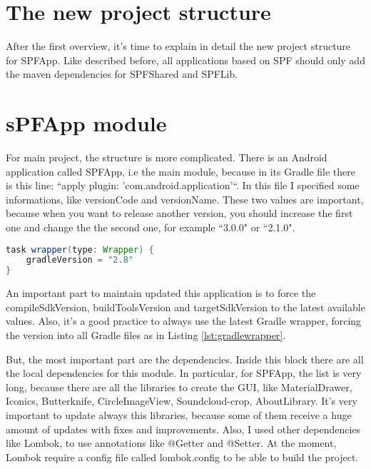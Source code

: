 \section{The new project structure}
After the first overview, it's time to explain in detail the new project structure for \textsf{SPFApp}. Like described before, all applications based on SPF should only add the maven dependencies for \textsf{SPFShared} and \textsf{SPFLib}.

\section*{sPFApp module}

For main project, the structure is more complicated.
There is an Android application called \textsf{SPFApp}, i.e the main module, because in its Gradle file there is this line: ``apply plugin: 'com.android.application'``.
In this file I specified some informations, like \textsf{versionCode} and \textsf{versionName}. These two values are important, because when you want to release another version, you should increase the first one and change the the second one, for example ``3.0.0" or ``2.1.0".

\begin{lstlisting}[caption={Gradle wapper},label=lst:gradlewrapper, language=Java]
task wrapper(type: Wrapper) {
    gradleVersion = "2.8"
}
\end{lstlisting}

An important part to maintain updated this application is to force the \textsf{compileSdkVersion}, \textsf{buildToolsVersion} and \textsf{targetSdkVersion} to the latest available values. Also, it's a good practice to always use the latest Gradle wrapper, forcing the version into all Gradle files as in Listing \ref{lst:gradlewrapper}.

But, the most important part are the dependencies.
Inside this block there are all the local dependencies for this module. In particular, for SPFApp, the list is very long, because there are all the libraries to create the GUI, like \textsf{MaterialDrawer}, \textsf{Iconics}, \textsf{Butterknife}, \textsf{CircleImageView}, \textsf{Soundcloud-crop}, \textsf{AboutLibrary}.
It's very important to update always this libraries, because some of them receive a huge amount of updates with fixes and improvements. Also, I used other dependencies like Lombok, to use annotations like @Getter and @Setter. At the moment, Lombok require a config file called \textsf{lombok.config} to be able to build the project.

